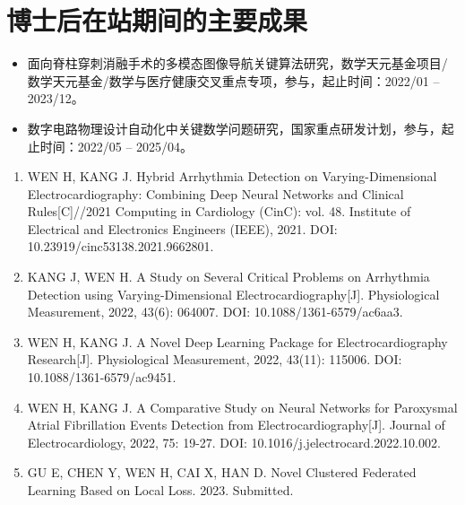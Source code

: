 \chapter*{博士后在站期间的主要成果}
\headheight=15.24pt%


\begin{itemize}
    \item 面向脊柱穿刺消融手术的多模态图像导航关键算法研究，数学天元基金项目/数学天元基金/数学与医疗健康交叉重点专项，参与，起止时间：2022/01 -- 2023/12。
    \item 数字电路物理设计自动化中关键数学问题研究，国家重点研发计划，参与，起止时间：2022/05 -- 2025/04。
\end{itemize}


\begin{enumerate}
    \item WEN H, KANG J. Hybrid Arrhythmia Detection on Varying-Dimensional Electrocardiography: Combining Deep Neural Networks and Clinical Rules[C]//2021 Computing in Cardiology (CinC): vol. 48. Institute of Electrical and Electronics Engineers (IEEE), 2021. DOI: 10.23919/cinc53138.2021.9662801.
    \item KANG J, WEN H. A Study on Several Critical Problems on Arrhythmia Detection using Varying-Dimensional Electrocardiography[J]. Physiological Measurement, 2022, 43(6): 064007. DOI: 10.1088/1361-6579/ac6aa3.
    \item WEN H, KANG J. A Novel Deep Learning Package for Electrocardiography Research[J]. Physiological Measurement, 2022, 43(11): 115006. DOI: 10.1088/1361-6579/ac9451.
    \item WEN H, KANG J. A Comparative Study on Neural Networks for Paroxysmal Atrial Fibrillation Events Detection from Electrocardiography[J]. Journal of Electrocardiology, 2022, 75: 19-27. DOI: 10.1016/j.jelectrocard.2022.10.002.
    \item GU E, CHEN Y, WEN H, CAI X, HAN D. Novel Clustered Federated Learning Based on Local Loss. 2023. Submitted.
\end{enumerate}



